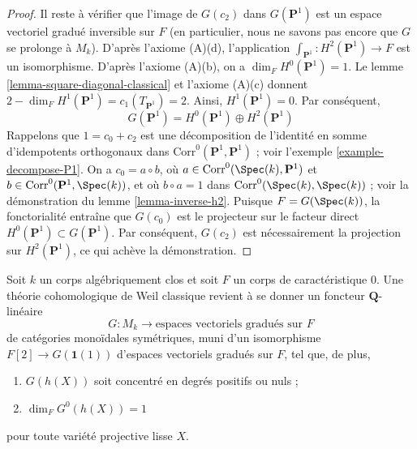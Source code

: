 \begin{proof}
\medskip\noindent
Il reste à vérifier que l'image de $G(c_2)$ dans $G(\mathbf{P}^1)$
est un espace vectoriel gradué inversible sur $F$ (en particulier, nous ne savons pas encore
que $G$ se prolonge à $M_k$).
D'après l'axiome (A)(d), l'application $\int_{\mathbf{P}^1} : H^2(\mathbf{P}^1) \to F$
est un isomorphisme. D'après l'axiome (A)(b), on a $\dim_F H^0(\mathbf{P}^1) = 1$.
Le lemme \ref{lemma-square-diagonal-classical} et l'axiome (A)(c)
donnent $2 - \dim_F H^1(\mathbf{P}^1) = c_1(T_{\mathbf{P}^1}) = 2$.
Ainsi, $H^1(\mathbf{P}^1) = 0$. Par conséquent,
$$
G(\mathbf{P}^1) = H^0(\mathbf{P}^1) \oplus H^2(\mathbf{P}^1)
$$
Rappelons que $1 = c_0 + c_2$ est une décomposition de l'identité
en somme d'idempotents orthogonaux dans
$\text{Corr}^0(\mathbf{P}^1, \mathbf{P}^1)$ ; voir
l'exemple \ref{example-decompose-P1}. On a $c_0 = a \circ b$, où
$a \in \text{Corr}^0(\Spec(k), \mathbf{P}^1)$ et
$b \in \text{Corr}^0(\mathbf{P}^1, \Spec(k))$, et où
$b \circ a = 1$ dans $\text{Corr}^0(\Spec(k), \Spec(k))$ ; voir la démonstration du
lemme \ref{lemma-inverse-h2}. Puisque $F = G(\Spec(k))$, la
fonctorialité entraîne que $G(c_0)$ est le projecteur sur le facteur direct
$H^0(\mathbf{P}^1) \subset G(\mathbf{P}^1)$. Par conséquent,
$G(c_2)$ est nécessairement la projection sur $H^2(\mathbf{P}^1)$,
ce qui achève la démonstration.
\end{proof}

\begin{proposition}
\label{proposition-weil-cohomology-theory-classical}
Soit $k$ un corps algébriquement clos et soit $F$ un corps de
caractéristique $0$. Une théorie cohomologique de Weil classique revient à se donner
un foncteur $\mathbf{Q}$-linéaire
$$
G : M_k \longrightarrow \text{espaces vectoriels gradués sur }F\text{}
$$
de catégories monoïdales symétriques, muni d'un isomorphisme
$F[2] \to G(\mathbf{1}(1))$ d'espaces vectoriels gradués sur $F$, tel que,
de plus,
\begin{enumerate}
\item $G(h(X))$ soit concentré en degrés positifs ou nuls ;
\item $\dim_F G^0(h(X)) = 1$
\end{enumerate}
pour toute variété projective lisse $X$.
\end{proposition}

